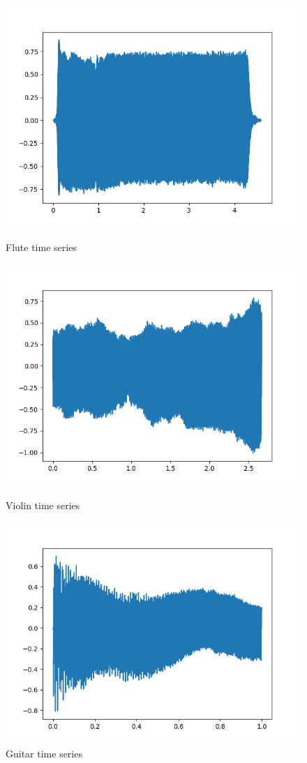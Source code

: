 \documentclass{article}
\begin{document}
\begin{figure}[!htbp]
  \includegraphics[width=\linewidth]{flute-timeSeries.png}
  \caption{Flute time series}\label{fig:a1}
\endminipage\hfill
{}
  \includegraphics[width=\linewidth]{violin-timeSeries.png}
  \caption{Violin time series}\label{fig:a2}
\endminipage\hfill
{}%
  \includegraphics[width=\linewidth]{guitar-timeSeries.png}
  \caption{Guitar time series}\label{fig:a3}
\endminipage
\end{figure}
\end{document}
